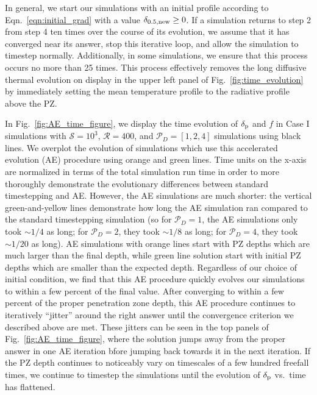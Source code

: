 \documentclass[twocolumn]{aastex631}
\newcommand{\delp}{\ensuremath{\delta_{\rm{p}}}}
\newcommand{\mP}{\ensuremath{\mathcal{P}}}
\newcommand{\mR}{\ensuremath{\mathcal{R}}}
\newcommand{\mS}{\ensuremath{\mathcal{S}}}
\begin{document}
In general, we start our simulations with an initial profile according to Eqn.~\ref{eqn:initial_grad} with a value $\delta_{0.5,\rm{new}} \geq 0$.
If a simulation returns to step 2 from step 4 ten times over the course of its evolution, we assume that it has converged near its answer, stop this iterative loop, and allow the simulation to timestep normally.
Additionally, in some simulations, we ensure that this process occurs no more than 25 times.
This process effectively removes the long diffusive thermal evolution on display in the upper left panel of Fig.~\ref{fig:time_evolution} by immediately setting the mean temperature profile to the radiative profile above the PZ.

In Fig.~\ref{fig:AE_time_figure}, we display the time evolution of $\delp$ and $f$ in Case I simulations with $\mS = 10^3$, $\mR = 400$, and $\mP_D = [1,2,4]$ simulations using black lines.
We overplot the evolution of simulations which use this accelerated evolution (AE) procedure using orange and green lines.
Time units on the x-axis are normalized in terms of the total simulation run time in order to more thoroughly demonstrate the evolutionary differences between standard timestepping and AE.
However, the AE simulations are much shorter: the vertical green-and-yellow lines demonstrate how long the AE simulation ran compared to the standard timestepping simulation (so for $\mP_D = 1$, the AE simulations only took $\sim 1/4$ as long; for $\mP_D = 2$, they took $\sim 1/8$ as long; for $\mP_D = 4$, they took $\sim 1/20$ as long).
AE simulations with orange lines start with PZ depths which are much larger than the final depth, while green line solution start with initial PZ depths which are smaller than the expected depth.
Regardless of our choice of initial condition, we find that this AE procedure quickly evolves our simulations to within a few percent of the final value.
After converging to within a few percent of the proper penetration zone depth, this AE procedure continues to iteratively ``jitter'' around the right answer until the convergence criterion we described above are met.
These jitters can be seen in the top panels of Fig.~\ref{fig:AE_time_figure}, where the solution jumps away from the proper answer in one AE iteration bfore jumping back towards it in the next iteration.
If the PZ depth continues to noticeably vary on timescales of a few hundred freefall times, we continue to timestep the simulations until the evolution of $\delp$ vs.~time has flattened.
\end{document}
